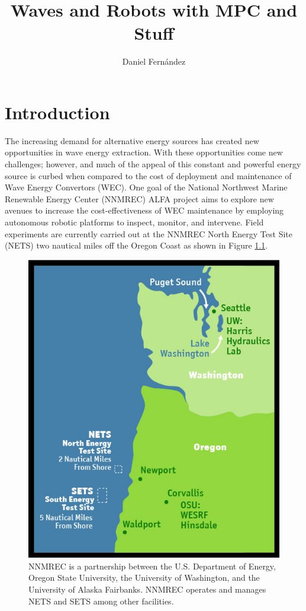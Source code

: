 \documentclass[double,12pt]{beavtex}
\title{Waves and Robots with MPC and Stuff}
\author{Daniel Fern\'{a}ndez}
\begin{document}
\maketitle
\mainmatter


\chapter{Introduction}

The increasing demand for alternative energy sources has created new opportunities in wave energy extraction. With these opportunities come new challenges; however, and much of the appeal of this constant and powerful energy source is curbed when compared to the cost of deployment and maintenance of Wave Energy Convertors (WEC). One goal of the National Northwest Marine Renewable Energy Center (NNMREC) ALFA project aims to explore new avenues to increase the cost-effectiveness of WEC maintenance by employing autonomous robotic platforms to inspect, monitor, and intervene. Field experiments are currently carried out at the NNMREC North Energy Test Site (NETS) two nautical miles off the Oregon Coast as shown in Figure \ref{fig:nets}. 

\begin{figure}[h!]
\begin{center}
\includegraphics[width=0.5\columnwidth]{nets}
\caption{NNMREC is a partnership between the U.S. Department of Energy, Oregon State University, the University of Washington, and the University of Alaska Fairbanks. NNMREC operates and manages NETS and SETS among other facilities.}
\label{fig:nets}
\end{center}
\end{figure}
\end{document}
